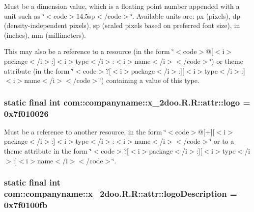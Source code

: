 Must be a dimension value, which is a floating point number appended with a unit such as \char`\"{}$<$code$>$14.5sp$<$/code$>$\char`\"{}. Available units are: px (pixels), dp (density-independent pixels), sp (scaled pixels based on preferred font size), in (inches), mm (millimeters). 

This may also be a reference to a resource (in the form \char`\"{}$<$code$>$@\mbox{[}$<$i$>$package$<$/i$>$:\mbox{]}$<$i$>$type$<$/i$>$:$<$i$>$name$<$/i$>$$<$/code$>$\char`\"{}) or theme attribute (in the form \char`\"{}$<$code$>$?\mbox{[}$<$i$>$package$<$/i$>$:\mbox{]}\mbox{[}$<$i$>$type$<$/i$>$:\mbox{]}$<$i$>$name$<$/i$>$$<$/code$>$\char`\"{}) containing a value of this type. \hypertarget{classcom_1_1companyname_1_1x__2doo_1_1_r_1_1attr_65ce28e23e047ab5f1cd39aeb8daa20c}{
\subsubsection[{logo}]{\setlength{\rightskip}{0pt plus 5cm}static final int com::companyname::x\_\-2doo.R.R::attr::logo = 0x7f010026}}
\label{classcom_1_1companyname_1_1x__2doo_1_1_r_1_1attr_65ce28e23e047ab5f1cd39aeb8daa20c}


Must be a reference to another resource, in the form \char`\"{}$<$code$>$@\mbox{[}+\mbox{]}\mbox{[}$<$i$>$package$<$/i$>$:\mbox{]}$<$i$>$type$<$/i$>$:$<$i$>$name$<$/i$>$$<$/code$>$\char`\"{} or to a theme attribute in the form \char`\"{}$<$code$>$?\mbox{[}$<$i$>$package$<$/i$>$:\mbox{]}\mbox{[}$<$i$>$type$<$/i$>$:\mbox{]}$<$i$>$name$<$/i$>$$<$/code$>$\char`\"{}. \hypertarget{classcom_1_1companyname_1_1x__2doo_1_1_r_1_1attr_c43d9451d5f166982cc12c2114392652}{
\subsubsection[{logoDescription}]{\setlength{\rightskip}{0pt plus 5cm}static final int com::companyname::x\_\-2doo.R.R::attr::logoDescription = 0x7f0100fb}}
\label{classcom_1_1companyname_1_1x__2doo_1_1_r_1_1attr_c43d9451d5f166982cc12c2114392652}


